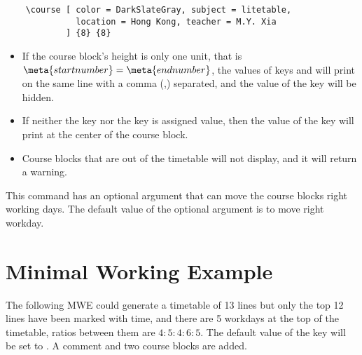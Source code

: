 \documentclass[letterpaper]{l3doc}
\begin{document}
\begin{framed}
  \begin{verbatim}
    \course [ color = DarkSlateGray, subject = litetable,
              location = Hong Kong, teacher = M.Y. Xia
            ] {8} {8}
  \end{verbatim}
\end{framed}

\begin{itemize}[topsep = 0pt]
  \item If the course block's height is only one unit, that is $\meta{start number} = \meta{end number}$, the values of keys  and  will print on the same line with a comma (,) separated, and the value of the key  will be hidden.
  \item If neither the key  nor the key  is assigned value, then the value of the key  will print at the center of the course block.
  \item Course blocks that are out of the timetable will not display, and it will return a warning.
\end{itemize}

\begin{function}{\newday}
  \begin{syntax}
  \end{syntax}

  This command has an optional argument that can move the course blocks right  working days. The default value of the optional argument is  to move right  workday.
\end{function}

\clearpage\linespread{1.375}

\section{Minimal Working Example}

The following MWE could generate a timetable of 13 lines but only the top 12 lines have been marked with time, and there are 5 workdays at the top of the timetable, ratios between them are $4:5:4:6:5$. The default value of the key  will be set to . A comment and two course blocks are added.
\end{document}
